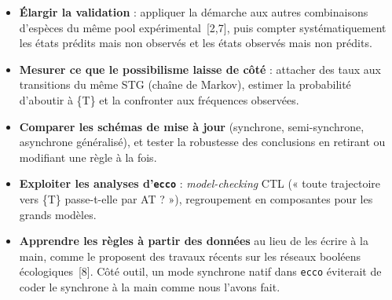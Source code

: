 \documentclass[10pt,a4paper]{article}
\newcommand{\titre}[1]{\par\vspace{0.5em}{\large\bfseries #1}\par\vspace{0.15em}}
\newcommand{\ecco}{\texttt{ecco}}
\begin{document}
\titre{3. Quelles perspectives ?}
\begin{itemize}
\item \textbf{Élargir la validation} : appliquer la démarche aux autres combinaisons d'espèces du même pool expérimental~[2,7], puis compter systématiquement les états prédits mais non observés et les états observés mais non prédits.
\item \textbf{Mesurer ce que le possibilisme laisse de côté} : attacher des taux aux transitions du même STG (chaîne de Markov), estimer la probabilité d'aboutir à \{T\} et la confronter aux fréquences observées.
\item \textbf{Comparer les schémas de mise à jour} (synchrone, semi-synchrone, asynchrone généralisé), et tester la robustesse des conclusions en retirant ou modifiant une règle à la fois.
\item \textbf{Exploiter les analyses d'\ecco} : \emph{model-checking} CTL (« toute trajectoire vers \{T\} passe-t-elle par AT ? »), regroupement en composantes pour les grands modèles.
\item \textbf{Apprendre les règles à partir des données} au lieu de les écrire à la main, comme le proposent des travaux récents sur les réseaux booléens écologiques~[8]. Côté outil, un mode synchrone natif dans \ecco{} éviterait de coder le synchrone à la main comme nous l'avons fait.
\end{itemize}
\end{document}
